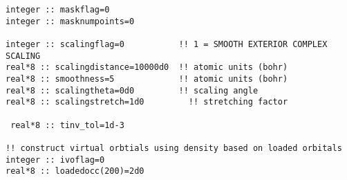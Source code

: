 \begin{verbatim}
integer :: maskflag=0
integer :: masknumpoints=0

integer :: scalingflag=0           !! 1 = SMOOTH EXTERIOR COMPLEX SCALING
real*8 :: scalingdistance=10000d0  !! atomic units (bohr)
real*8 :: smoothness=5             !! atomic units (bohr)
real*8 :: scalingtheta=0d0         !! scaling angle
real*8 :: scalingstretch=1d0         !! stretching factor

 real*8 :: tinv_tol=1d-3

!! construct virtual orbtials using density based on loaded orbitals
integer :: ivoflag=0
real*8 :: loadedocc(200)=2d0
\end{verbatim}
